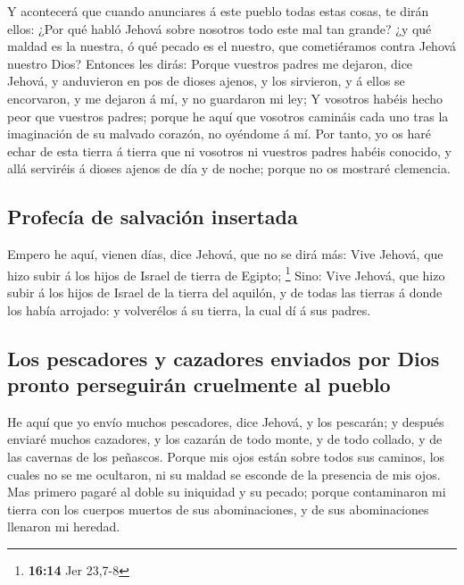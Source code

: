  Y acontecerá que cuando anunciares á este pueblo todas
estas cosas, te dirán ellos: ¿Por qué habló Jehová sobre nosotros todo
este mal tan grande? ¿y qué maldad es la nuestra, ó qué pecado es el
nuestro, que cometiéramos contra Jehová nuestro Dios? 
Entonces les dirás: Porque vuestros padres me dejaron, dice Jehová, y
anduvieron en pos de dioses ajenos, y los sirvieron, y á ellos se
encorvaron, y me dejaron á mí, y no guardaron mi ley;  Y
vosotros habéis hecho peor que vuestros padres; porque he aquí que
vosotros camináis cada uno tras la imaginación de su malvado corazón, no
oyéndome á mí.  Por tanto, yo os haré echar de esta
tierra á tierra que ni vosotros ni vuestros padres habéis conocido, y
allá serviréis á dioses ajenos de día y de noche; porque no os mostraré
clemencia.

\hypertarget{profecuxeda-de-salvaciuxf3n-insertada}{%
\subsection{Profecía de salvación
insertada}\label{profecuxeda-de-salvaciuxf3n-insertada}}

 Empero he aquí, vienen días, dice Jehová, que no se dirá
más: Vive Jehová, que hizo subir á los hijos de Israel de tierra de
Egipto; \footnote{\textbf{16:14} Jer 23,7-8}  Sino: Vive
Jehová, que hizo subir á los hijos de Israel de la tierra del aquilón, y
de todas las tierras á donde los había arrojado: y volverélos á su
tierra, la cual dí á sus padres.

\hypertarget{los-pescadores-y-cazadores-enviados-por-dios-pronto-perseguiruxe1n-cruelmente-al-pueblo}{%
\subsection{Los pescadores y cazadores enviados por Dios pronto
perseguirán cruelmente al
pueblo}\label{los-pescadores-y-cazadores-enviados-por-dios-pronto-perseguiruxe1n-cruelmente-al-pueblo}}

 He aquí que yo envío muchos pescadores, dice Jehová, y
los pescarán; y después enviaré muchos cazadores, y los cazarán de todo
monte, y de todo collado, y de las cavernas de los peñascos.
 Porque mis ojos están sobre todos sus caminos, los
cuales no se me ocultaron, ni su maldad se esconde de la presencia de
mis ojos.  Mas primero pagaré al doble su iniquidad y su
pecado; porque contaminaron mi tierra con los cuerpos muertos de sus
abominaciones, y de sus abominaciones llenaron mi heredad.

